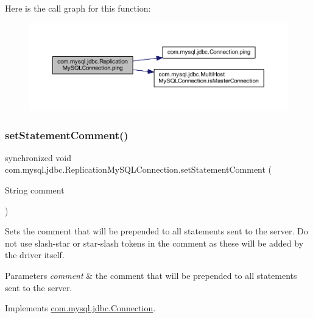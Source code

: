 Here is the call graph for this function\+:
\nopagebreak
\begin{figure}[H]
\begin{center}
\leavevmode
\includegraphics[width=350pt]{classcom_1_1mysql_1_1jdbc_1_1_replication_my_s_q_l_connection_a2cf454e00e9fe6dcb74bb37405562e6d_cgraph}
\end{center}
\end{figure}
\mbox{\label{classcom_1_1mysql_1_1jdbc_1_1_replication_my_s_q_l_connection_aa7fc0fd1686f31130f8737f89087b8bd}} 
\subsubsection{\texorpdfstring{set\+Statement\+Comment()}{setStatementComment()}}
{\footnotesize\ttfamily synchronized void com.\+mysql.\+jdbc.\+Replication\+My\+S\+Q\+L\+Connection.\+set\+Statement\+Comment (\begin{DoxyParamCaption}\item[{String}]{comment }\end{DoxyParamCaption})}

Sets the comment that will be prepended to all statements sent to the server. Do not use slash-\/star or star-\/slash tokens in the comment as these will be added by the driver itself.


\begin{DoxyParams}{Parameters}
{\em comment} & the comment that will be prepended to all statements sent to the server. \\
\hline
\end{DoxyParams}


Implements \mbox{\hyperlink{interfacecom_1_1mysql_1_1jdbc_1_1_connection_a94f38f8f7d8afd2a7bf6c87ad0d5d422}{com.\+mysql.\+jdbc.\+Connection}}.

